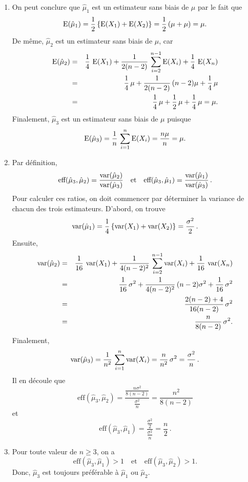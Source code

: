 \begin{solution}{3.9}
\begin{enumerate}
\item On peut conclure que ${\hat \mu}_1$ est un estimateur sans biais de $\mu$ par le fait que
$$
\operatorname{E}({\hat \mu}_1) = \frac{1}{2} \, \{ \operatorname{E} (X_1) + \operatorname{E}(X_2)\} = \frac{1}{2} \, (\mu + \mu) = \mu.
$$
De même, ${\hat \mu}_2$ est un estimateur sans biais de $\mu$, car
\begin{eqnarray*}
\operatorname{E} ({\hat \mu}_2) &=& \frac{1}{4} \, \operatorname{E} (X_1) + \frac{1}{2(n-2)} \, \sum_{i=2}^{n-1} \operatorname{E} (X_i) + \frac{1}{4} \, \operatorname{E} (X_n) \\
&=& \frac{1}{4} \, \mu + \frac{1}{2(n-2)} \, (n-2)\mu + \frac{1}{4} \, \mu \\
&=& \frac{1}{4} \, \mu + \frac{1}{2} \, \mu + \frac{1}{4} \, \mu = \mu.
\end{eqnarray*}
Finalement, ${\hat \mu}_3$ est un estimateur sans biais de $\mu$ puisque
$$
\operatorname{E} ( {\hat \mu}_3) = \frac{1}{n} \, \sum_{i=1}^n \operatorname{E} (X_i) = \frac{n\mu}{n} = \mu.
$$

\item Par définition,
$$
\mbox{eff} ({\hat \mu}_3, {\hat \mu}_2) = \frac{\operatorname{var}({\hat \mu}_2)} {\operatorname{var} ({\hat \mu}_3)} \quad \mbox{et} \quad \mbox{eff} ({\hat \mu}_3, {\hat \mu}_1) = \frac{\operatorname{var}({\hat \mu}_1)} {\operatorname{var} ({\hat \mu}_3)} \,.
$$
Pour calculer ces ratios, on doit commencer par déterminer la variance de chacun des trois estimateurs. D'abord, on trouve
$$
\operatorname{var}({\hat \mu}_1) = \frac{1}{4} \, \{ \operatorname{var} (X_1) + \operatorname{var} (X_2) \} = \frac{\sigma^2}{2} \, .
$$
Ensuite,
\begin{eqnarray*}
\operatorname{var}({\hat \mu}_2) &=& \frac{1}{16} \, \operatorname{var}( X_1) + \frac{1}{4(n-2)^2} \, \sum_{i=2}^{n-1} \operatorname{var} (X_i) + \frac{1}{16} \, \operatorname{var}( X_n) \\
&=& \frac{1}{16} \, \sigma^2 + \frac{1}{4(n-2)^2} \, (n-2) \sigma^2 + \frac{1}{16} \, \sigma^2 \\
&=& \frac{2(n-2) + 4}{16(n-2)} \, \sigma^2 \\
&=& \frac{n}{8(n-2)} \, \sigma^2.
\end{eqnarray*}
Finalement,
$$
\operatorname{var}({\hat \mu}_3) = \frac{1}{n^2} \, \sum_{i=1}^n \operatorname{var} (X_i) = \frac{n}{n^2} \, \sigma^2 = \frac{\sigma^2}{n} \, .
$$
Il en découle que
$$
\mbox{eff} ({\hat \mu}_3, {\hat \mu}_2) =  \frac{\displaystyle\frac{n\sigma^2}{8(n-2)}}{\displaystyle\frac{\sigma^2}{n}} =  \frac{n^2}{8(n-2)}
$$
et
$$
\mbox{eff} ({\hat \mu}_3, {\hat \mu}_1) =  \frac{\displaystyle\frac{\sigma^2}{2}}{\displaystyle\frac{\sigma^2}{n}} =  \frac{n}{2} \, .
$$

\item Pour toute valeur de $n \ge 3$, on a
$$
\mbox{eff} ({\hat \mu}_3, {\hat \mu}_1) > 1 \quad \mbox{et} \quad \mbox{eff} ({\hat \mu}_3, {\hat \mu}_2) > 1.
$$
Donc, ${\hat \mu}_3$ est toujours préférable à ${\hat \mu}_1$ ou ${\hat \mu}_2$.
\end{enumerate}
\end{solution}

